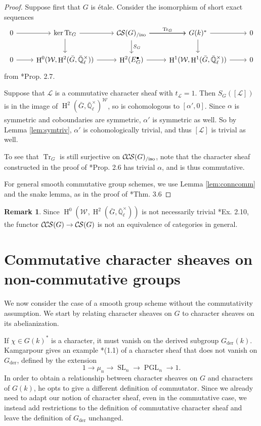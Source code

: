 \documentclass[10pt]{amsart}
\theoremstyle{plain}
\theoremstyle{definition}
\newtheorem{remark}[theorem]{Remark}
\newcommand{\EE}{\mathbb{\bar Q}_\ell}
\newcommand{\Fq}{k}
\newcommand{\EEx}{\EE^\times}
\newcommand{\Weil}[1]{\mathcal{W}_{#1}}
\DeclareMathOperator{\Hh}{H}
\DeclareMathOperator{\SL}{SL}
\DeclareMathOperator{\PGL}{PGL}
\newcommand{\der}{_{\operatorname{der}}}
\newcommand{\trFrob}[1]{t_{#1}}
\newcommand{\TrFrob}[1]{\operatorname{Tr}_{#1}}
\newcommand{\cs}[1]{{\mathcal{#1}}}
\newcommand{\CS}{{\mathcal{C\hskip-0.8pt S}}}
\newcommand{\CCS}{{\mathcal{C\hskip-.8pt C\hskip-0.8pt S}}}
\newcommand{\CSiso}[1]{\CS(#1)_{/\text{iso}}}
\newcommand{\CCSiso}[1]{\CCS(#1)_{/\text{iso}}}
\newcommand{\bG}{\bar{G}}
\begin{document}
\begin{proof}
Suppose first that $G$ is \'etale.  Consider the isomorphism of short exact sequences
\[
\begin{tikzcd}
 0 \arrow{r} & \ker \TrFrob{G} \arrow{d} \arrow{r} & \CSiso{G}\arrow{d}{S_G} \arrow{r}{\TrFrob{G}} \arrow{r} & G(\Fq)^* \arrow{d} \arrow{r} & 0\\
  0 \arrow{r} & \Hh^0(\Weil{},\Hh^2(\bG,\EEx)) \arrow{r} & \Hh^2(E^\bullet_G) \arrow{r} & \Hh^1(\Weil{},\Hh^1(\bG,\EEx)) \arrow{r} & 0
 \end{tikzcd}
 \]
from \cite{cunningham-roe:13a}*{Prop. 2.7}.

Suppose that $\cs{L}$ is a commutative character sheaf
with $\trFrob{\cs{L}} = 1$.  Then $S_G([\cs{L}])$ is in the image of $\Hh^2(\bG, \EEx)^\Weil{}$, so is cohomologous to
$[\alpha', 0]$.  Since $\alpha$ is symmetric and coboundaries are symmetric, $\alpha'$ is symmetric as well.
So by Lemma \ref{lem:symtriv}, $\alpha'$ is cohomologically trivial, and thus $[\cs{L}]$ is trivial as well.

To see that $\TrFrob{G}$ is still surjective on $\CCSiso{G}$, note that the character sheaf constructed in the proof of
\cite{cunningham-roe:13a}*{Prop. 2.6} has trivial $\alpha$, and is thus commutative.

For general smooth commutative group schemes, we use Lemma \ref{lem:conncomm} and the snake lemma, as in the proof of
\cite{cunningham-roe:13a}*{Thm. 3.6}
\end{proof}

\begin{remark}
Since $\Hh^0(\Weil{},\Hh^2(\bG,\EEx))$ is not necessarily trivial \cite{cunningham-roe:13a}*{Ex. 2.10}, the functor
$\CCS(G) \to \CS(G)$ is not an equivalence of categories in general.
\end{remark}

\section{Commutative character sheaves on non-commutative groups}\label{sec:noncom}

We now consider the case of a smooth group scheme without the commutativity assumption.  We start
by relating character sheaves on $G$ to character sheaves on its abelianization.

If $\chi \in G(k)^*$ is a character, it must vanish on the derived subgroup $G\der(k)$.
Kamgarpour gives an example \cite{kamgarpour:09a}*{(1.1)} of a character sheaf
that does not vanish on $G\der$, defined by the extension
\[
1 \to \mu_n \to \SL_n \to \PGL_n \to 1.
\]
In order to obtain a relationship between character sheaves on $G$ and characters of $G(k)$,
he opts to give a different definition of commutator.  Since we already need to adapt our
notion of character sheaf, even in the commutative case, we instead add restrictions
to the definition of commutative character sheaf and leave the definition of $G\der$ unchanged.
\end{document}
